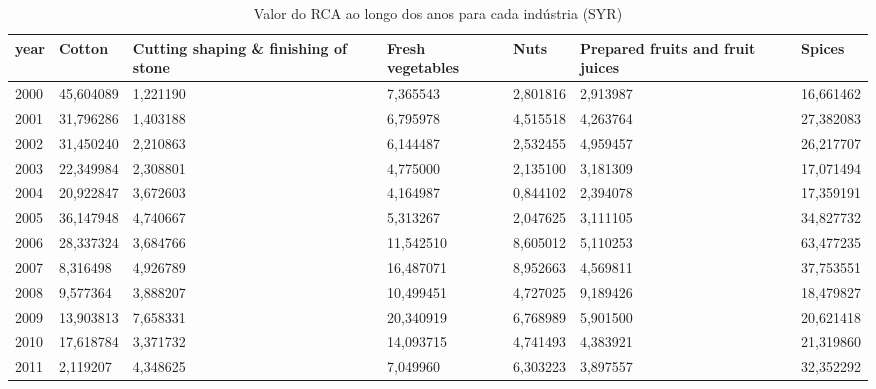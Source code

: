 \begin{table}
\centering
\caption{Valor do RCA ao longo dos anos para cada indústria (SYR)}
\begin{tabular}{p{1cm}p{2cm}p{2cm}p{2cm}p{2cm}p{2cm}p{2cm}}
\toprule
 year &     Cotton &  Cutting shaping \& finishing of stone &  Fresh vegetables &      Nuts &  Prepared fruits and fruit juices &     Spices \\
\midrule
 2000 &  45,604089 &                              1,221190 &          7,365543 &  2,801816 &                          2,913987 &  16,661462 \\
 2001 &  31,796286 &                              1,403188 &          6,795978 &  4,515518 &                          4,263764 &  27,382083 \\
 2002 &  31,450240 &                              2,210863 &          6,144487 &  2,532455 &                          4,959457 &  26,217707 \\
 2003 &  22,349984 &                              2,308801 &          4,775000 &  2,135100 &                          3,181309 &  17,071494 \\
 2004 &  20,922847 &                              3,672603 &          4,164987 &  0,844102 &                          2,394078 &  17,359191 \\
 2005 &  36,147948 &                              4,740667 &          5,313267 &  2,047625 &                          3,111105 &  34,827732 \\
 2006 &  28,337324 &                              3,684766 &         11,542510 &  8,605012 &                          5,110253 &  63,477235 \\
 2007 &   8,316498 &                              4,926789 &         16,487071 &  8,952663 &                          4,569811 &  37,753551 \\
 2008 &   9,577364 &                              3,888207 &         10,499451 &  4,727025 &                          9,189426 &  18,479827 \\
 2009 &  13,903813 &                              7,658331 &         20,340919 &  6,768989 &                          5,901500 &  20,621418 \\
 2010 &  17,618784 &                              3,371732 &         14,093715 &  4,741493 &                          4,383921 &  21,319860 \\
 2011 &   2,119207 &                              4,348625 &          7,049960 &  6,303223 &                          3,897557 &  32,352292 \\

\end{tabular}
\end{table}
